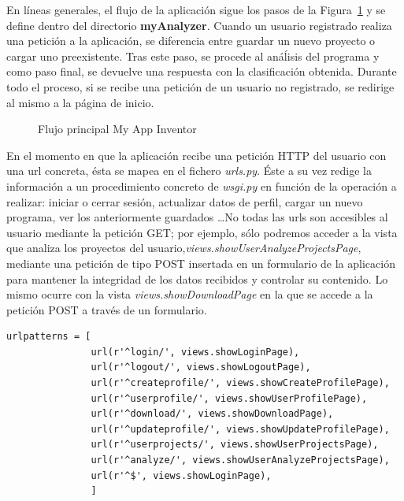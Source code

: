 \documentclass[a4paper, 12pt]{book}
\begin{document}
En líneas generales, el flujo de la aplicación sigue los pasos de la Figura~\ref{fig:flujoapp} y se define dentro del directorio \textbf{myAnalyzer}. Cuando un usuario registrado realiza una petición a la aplicación, se diferencia entre guardar un nuevo proyecto o cargar uno preexistente. Tras este paso, se procede al anáĺisis del programa y como paso final, se devuelve una respuesta con la clasificación obtenida. Durante todo el proceso, si se recibe una petición de un usuario no registrado, se redirige al mismo a la página de inicio. 
\begin{figure}[H]
  \centering
  \caption{Flujo principal My App Inventor}
  \label{fig:flujoapp}
\end{figure}
En el momento en que la aplicación recibe una petición HTTP del usuario con una url concreta, ésta se mapea en el fichero \textit{urls.py}. Éste a su vez redige la información a un procedimiento concreto de \textit{wsgi.py} en función de la operación a realizar: iniciar o cerrar sesión, actualizar datos de perfil, cargar un nuevo programa, ver los anteriormente guardados \ldots No todas las urls son accesibles al usuario mediante la petición GET; por ejemplo, sólo podremos acceder a la vista que analiza los proyectos del usuario,\textit{views.showUserAnalyzeProjectsPage}, mediante una petición de tipo POST insertada en un formulario de la aplicación para mantener la integridad de los datos recibidos y controlar su contenido. Lo mismo ocurre con la vista \textit{views.showDownloadPage} en la que se accede a la petición POST a través de un formulario.
\begin{verbatim}
urlpatterns = [
               url(r'^login/', views.showLoginPage),
               url(r'^logout/', views.showLogoutPage),
               url(r'^createprofile/', views.showCreateProfilePage),
               url(r'^userprofile/', views.showUserProfilePage),
               url(r'^download/', views.showDownloadPage),
               url(r'^updateprofile/', views.showUpdateProfilePage),
               url(r'^userprojects/', views.showUserProjectsPage),
               url(r'^analyze/', views.showUserAnalyzeProjectsPage),
               url(r'^$', views.showLoginPage),
               ]
\end{verbatim}
\end{document}
